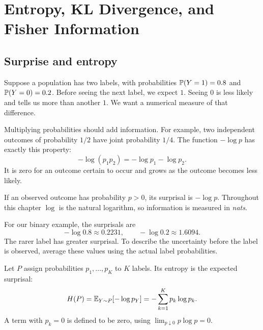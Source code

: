 \chapter{Entropy, KL Divergence, and Fisher Information}
\label{chap:information}

\begingroup
{}



\section{Surprise and entropy}
\label{sec:entropy}

Suppose a population has two labels, with probabilities
\(\mathbb{P}(Y=1)=0.8\) and \(\mathbb{P}(Y=0)=0.2\).
Before seeing the next label, we expect \(1\). Seeing \(0\) is less
likely and tells us more than another \(1\). We want a numerical measure
of that difference.

Multiplying probabilities should add information. For example, two
independent outcomes of probability \(1/2\) have joint probability
\(1/4\). The function \(-\log p\) has exactly this property:
\[
  -\log(p_1p_2)=-\log p_1-\log p_2.
\]
It is zero for an outcome certain to occur and grows as the outcome
becomes less likely.

\begin{definition}[Surprisal]
If an observed outcome has probability \(p>0\), its surprisal is
\(-\log p\). Throughout this chapter \(\log\) is the natural logarithm,
so information is measured in \emph{nats}.
\end{definition}

For our binary example, the surprisals are
\[
  -\log0.8\approx0.2231,\qquad -\log0.2\approx1.6094.
\]
The rarer label has greater surprisal. To describe the uncertainty
before the label is observed, average these values using the actual
label probabilities.

\begin{definition}
Let \(P\) assign probabilities \(p_1,\ldots,p_K\) to \(K\) labels.
Its entropy is the expected surprisal:
\begin{equation}
  H(P)=\mathbb{E}_{Y\sim P}[-\log p_Y]
      =-\sum_{k=1}^{K}p_k\log p_k.
  \label{eq:entropy}
\end{equation}
A term with \(p_k=0\) is defined to be zero, using
\(\lim_{p\downarrow0}p\log p=0\).
\end{definition}

